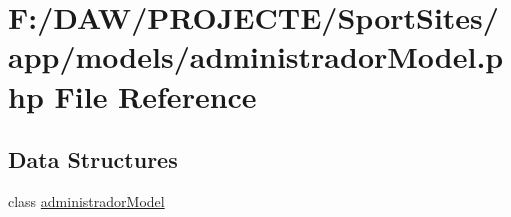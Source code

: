 \hypertarget{administrador_model_8php}{}\section{F\+:/\+D\+A\+W/\+P\+R\+O\+J\+E\+C\+T\+E/\+Sport\+Sites/app/models/administrador\+Model.php File Reference}
\label{administrador_model_8php}
\subsection*{Data Structures}
\begin{DoxyCompactItemize}
\item 
class \hyperlink{classadministrador_model}{administrador\+Model}
\end{DoxyCompactItemize}
